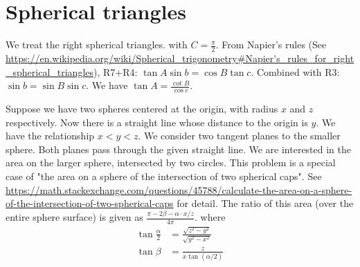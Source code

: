\documentclass{article}
\begin{document}
\section{Spherical triangles}
We treat the  right spherical triangles. with $C=\frac{\pi}{2}$.
From Napier's rules
(See \url{https://en.wikipedia.org/wiki/Spherical_trigonometry#Napier's_rules_for_right_spherical_triangles}),
R7+R4: $\tan A \sin b = \cos B \tan c$.
Combined with R3: $\sin b = \sin B \sin c$.
We have $\tan A = \frac{\cot B}{\cos c}$.

Suppose we have two spheres centered at the origin, with radius $x$ and $z$ respectively.
Now there is a straight line whose distance to the origin is $y$.
We have the relationship $x<y<z$.
We consider two tangent planes to the smaller sphere.
Both planes pass through the given straight line.
We are interested in the area
on the larger sphere,
intersected by two circles.
This problem is a special case
of "the area on a sphere of the intersection of two spherical caps".
See \url{https://math.stackexchange.com/questions/45788/calculate-the-area-on-a-sphere-of-the-intersection-of-two-spherical-caps}
for detail.
The ratio of this area (over the entire sphere surface)
is given as
$\frac{\pi - 2\beta - \alpha \cdot x/z}{4\pi}$.
where
\begin{align}
\tan \frac{\alpha}{2} & = \frac{\sqrt{z^2-y^2}}{
    \sqrt{y^2-x^2}}\\
\tan \beta &= \frac{z}{ 
    x  \tan(\alpha/2)}
\end{align}



\end{document}
